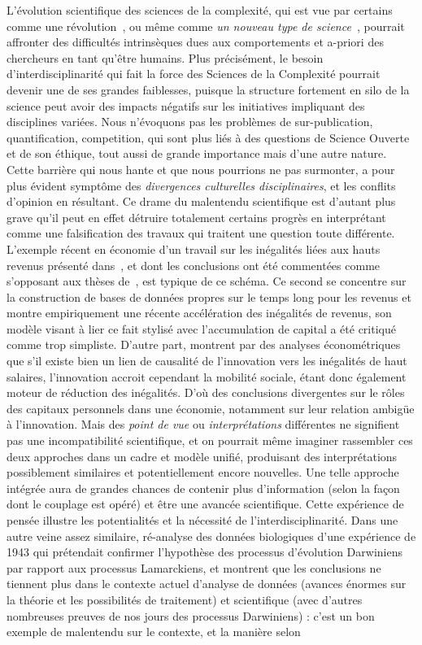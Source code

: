 {}{
L'évolution scientifique des sciences de la complexité, qui est vue par certains comme une révolution~\cite{colander2003complexity}, ou même comme \emph{un nouveau type de science}~\cite{wolfram2002new}, pourrait affronter des difficultés intrinsèques dues aux comportements et a-priori des chercheurs en tant qu'être humains. Plus précisément, le besoin d'interdisciplinarité qui fait la force des Sciences de la Complexité pourrait devenir une de ses grandes faiblesses, puisque la structure fortement en silo de la science peut avoir des impacts négatifs sur les initiatives impliquant des disciplines variées. Nous n'évoquons pas les problèmes de sur-publication, quantification, competition, qui sont plus liés à des questions de Science Ouverte et de son éthique, tout aussi de grande importance mais d'une autre nature. Cette barrière qui nous hante et que nous pourrions ne pas surmonter, a pour plus évident symptôme des \emph{divergences culturelles disciplinaires}, et les conflits d'opinion en résultant. Ce drame du malentendu scientifique est d'autant plus grave qu'il peut en effet détruire totalement certains progrès en interprétant comme une falsification des travaux qui traitent une question toute différente. L'exemple récent en économie d'un travail sur les inégalités liées aux hauts revenus présenté dans~\cite{aghion2015innovation}, et dont les conclusions ont été commentées comme s'opposant aux thèses de~\cite{piketty2013capital}, est typique de ce schéma. Ce second se concentre sur la construction de bases de données propres sur le temps long pour les revenus et montre empiriquement une récente accélération des inégalités de revenus, son modèle visant à lier ce fait stylisé avec l'accumulation de capital a été critiqué comme trop simpliste. D'autre part, \cite{aghion2015innovation} montrent par des analyses économétriques que s'il existe bien un lien de causalité de l'innovation vers les inégalités de haut salaires, l'innovation accroit cependant la mobilité sociale, étant donc également moteur de réduction des inégalités. D'où des conclusions divergentes sur le rôles des capitaux personnels dans une économie, notamment sur leur relation ambigüe à l'innovation. Mais des \emph{point de vue} ou \emph{interprétations} différentes ne signifient pas une incompatibilité scientifique, et on pourrait même imaginer rassembler ces deux approches dans un cadre et modèle unifié, produisant des interprétations possiblement similaires et potentiellement encore nouvelles. Une telle approche intégrée aura de grandes chances de contenir plus d'information (selon la façon dont le couplage est opéré) et être une avancée scientifique. Cette expérience de pensée illustre les potentialités et la nécessité de l'interdisciplinarité. Dans une autre veine assez similaire, \cite{2017arXiv170105627H} ré-analyse des données biologiques d'une expérience de 1943 qui prétendait confirmer l'hypothèse des processus d'évolution Darwiniens par rapport aux processus Lamarckiens, et montrent que les conclusions ne tiennent plus dans le contexte actuel d'analyse de données (avances énormes sur la théorie et les possibilités de traitement) et scientifique (avec d'autres nombreuses preuves de nos jours des processus Darwiniens) : c'est un bon exemple de malentendu sur le contexte, et la manière selon }
